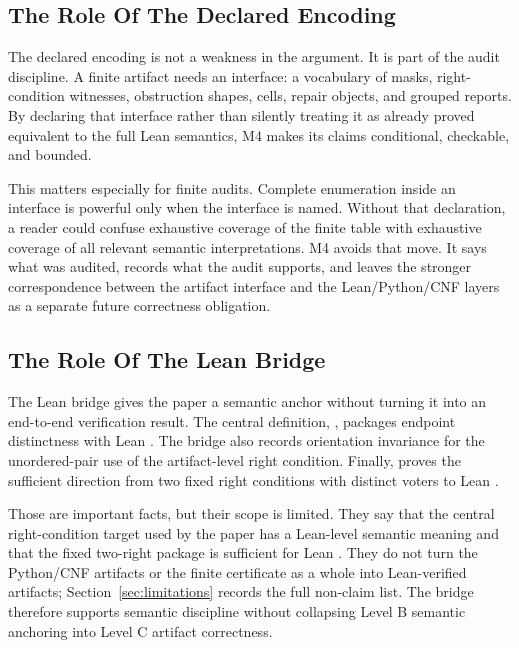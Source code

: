 \subsection{The Role Of The Declared Encoding}

The declared encoding is not a weakness in the argument. It is part of the
audit discipline. A finite artifact needs an interface: a vocabulary of masks,
right-condition witnesses, obstruction shapes, cells, repair objects, and
grouped reports. By declaring that interface rather than silently treating it
as already proved equivalent to the full Lean semantics, M4 makes its claims
conditional, checkable, and bounded.

This matters especially for finite audits. Complete enumeration inside an
interface is powerful only when the interface is named. Without that
declaration, a reader could confuse exhaustive coverage of the finite table
with exhaustive coverage of all relevant semantic interpretations. M4 avoids
that move. It says what was audited, records what the audit supports, and
leaves the stronger correspondence between the artifact interface and the
Lean/Python/CNF layers as a separate future correctness obligation.

\subsection{The Role Of The Lean Bridge}

The Lean bridge gives the paper a semantic anchor without turning it into an
end-to-end verification result. The central definition,
, packages endpoint distinctness with Lean
. The bridge also records orientation invariance for the
unordered-pair use of the artifact-level right condition. Finally,
 proves the sufficient direction from two
fixed right conditions with distinct voters to Lean .

Those are important facts, but their scope is limited. They say that the
central right-condition target used by the paper has a Lean-level semantic
meaning and that the fixed two-right package is sufficient for Lean
. They do not turn the Python/CNF artifacts or the finite
certificate as a whole into Lean-verified artifacts; Section~\ref{sec:limitations}
records the full non-claim list. The bridge therefore supports semantic
discipline without collapsing Level B semantic anchoring into Level C artifact
correctness.

